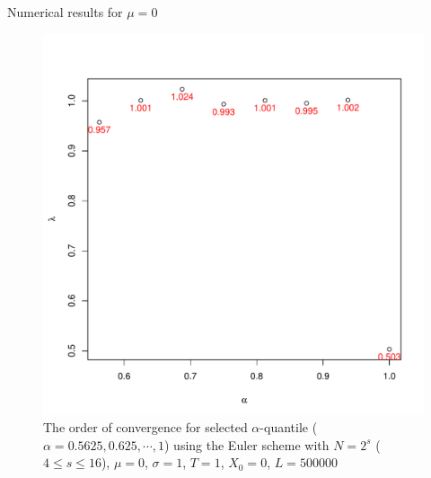 \documentclass[cjk,10pt]{beamer}
\begin{document}
\begin{frame}{Numerical results for $\mu=0$}
\begin{figure}
   \centering
   \includegraphics[scale=0.3]{nout_0rato.pdf} %
   \caption{The order of convergence for selected $\alpha$-quantile ($\alpha = 0.5625, 0.625,  \cdots, 1$) using the Euler scheme with $N = 2^s$ ($4\le s \le 16$), $\mu=0$, $\sigma=1$, $T=1$, $X_0=0$, $L=500000$}
   \label{f:rate}
\end{figure}
\end{frame}
\end{document}
